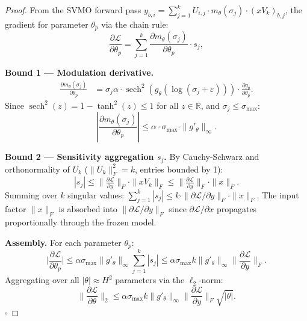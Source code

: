 \documentclass[conference]{IEEEtran}
\newcommand{\RR}{\mathbb{R}}
\newcommand{\sech}{\operatorname{sech}}
\begin{document}
\begin{proof}
From the SVMO forward pass $y_{b,i} = \sum_{j=1}^k U_{i,j} \cdot m_\theta(\sigma_j) \cdot (xV_k)_{b,j}$, the gradient for parameter $\theta_p$ via the chain rule:
\begin{equation}
\frac{\partial\mathcal{L}}{\partial\theta_p} = \sum_{j=1}^k \frac{\partial m_\theta(\sigma_j)}{\partial\theta_p} \cdot s_j,
\end{equation}

\textbf{Bound 1 --- Modulation derivative.}
\begin{align}
\frac{\partial m_\theta(\sigma_j)}{\partial\theta_p} &= \sigma_j\alpha \cdot \sech^2(g_\theta(\log(\sigma_j{+}\varepsilon))) \cdot \frac{\partial g_\theta}{\partial\theta_p}.
\end{align}
Since $\sech^2(z) = 1 - \tanh^2(z) \leq 1$ for all $z \in \RR$, and $\sigma_j \leq \sigma_{\max}$:
\begin{equation}
\left|\frac{\partial m_\theta(\sigma_j)}{\partial\theta_p}\right| \leq \alpha \cdot \sigma_{\max} \cdot \|g'_\theta\|_\infty.
\end{equation}

\textbf{Bound 2 --- Sensitivity aggregation $s_j$.}
By Cauchy-Schwarz and orthonormality of $U_k$ ($\|U_k\|_F^2 = k$, entries bounded by 1):
\begin{equation}
|s_j| \leq \big\|\tfrac{\partial\mathcal{L}}{\partial y}\big\|_F \cdot \|xV_k\|_F \leq \big\|\tfrac{\partial\mathcal{L}}{\partial y}\big\|_F \cdot \|x\|_F.
\end{equation}
Summing over $k$ singular values: $\sum_{j=1}^k |s_j| \leq k \cdot \|\partial\mathcal{L}/\partial y\|_F \cdot \|x\|_F$. The input factor $\|x\|_F$ is absorbed into $\|\partial\mathcal{L}/\partial y\|_F$ since $\partial\mathcal{L}/\partial x$ propagates proportionally through the frozen model.

\textbf{Assembly.}
For each parameter $\theta_p$:
\begin{equation}
\Big|\frac{\partial\mathcal{L}}{\partial\theta_p}\Big| \leq \alpha\sigma_{\max} \|g'_\theta\|_\infty \sum_{j=1}^k |s_j| \leq \alpha\sigma_{\max} k \|g'_\theta\|_\infty \Big\|\frac{\partial\mathcal{L}}{\partial y}\Big\|_F.
\end{equation}
Aggregating over all $|\theta| \approx H^2$ parameters via the $\ell_2$-norm:
\begin{equation}
\Big\|\frac{\partial\mathcal{L}}{\partial\theta}\Big\|_2 \leq \alpha\sigma_{\max} k \|g'_\theta\|_\infty \Big\|\frac{\partial\mathcal{L}}{\partial y}\Big\|_F \sqrt{|\theta|}.
\end{equation}
$\square$
\end{proof}
\end{document}
